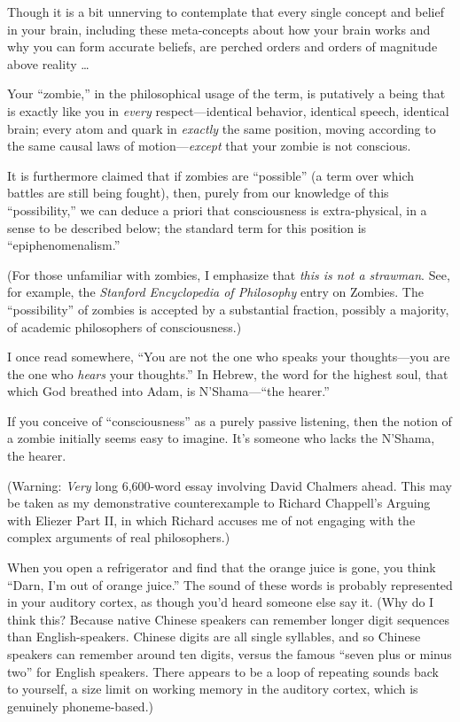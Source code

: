 {
 Though it is a bit unnerving to contemplate that every single
concept and belief in your brain, including these meta-concepts about
how your brain works and why you can form accurate beliefs, are perched
orders and orders of magnitude above reality \ldots}

\myendsectiontext


{
 Your ``zombie,'' in the
philosophical usage of the term, is putatively a being that is exactly
like you in \textit{every} respect---identical behavior, identical
speech, identical brain; every atom and quark in \textit{exactly} the
same position, moving according to the same causal laws of
motion---\textit{except} that your zombie is not conscious.}

{
 It is furthermore claimed that if zombies are
``possible'' (a term over which
battles are still being fought), then, purely from our knowledge of
this ``possibility,'' we can deduce
a priori that consciousness is extra-physical, in a sense to be
described below; the standard term for this position is
``epiphenomenalism.''}

{
 (For those unfamiliar with zombies, I emphasize that \textit{this
is not a strawman}. See, for example, the \textit{Stanford Encyclopedia
of Philosophy} entry on Zombies. The
``possibility'' of zombies is
accepted by a substantial fraction, possibly a majority, of academic
philosophers of consciousness.)}

{
 I once read somewhere, ``You are not the one who
speaks your thoughts---you are the one who \textit{hears} your
thoughts.'' In Hebrew, the word for the highest soul,
that which God breathed into Adam, is
N'Shama---``the
hearer.''}

{
 If you conceive of
``consciousness'' as a purely
passive listening, then the notion of a zombie initially seems easy to
imagine. It's someone who lacks the
N'Shama, the hearer.}

{
 (Warning: \textit{Very} long 6,600-word essay involving David
Chalmers ahead. This may be taken as my demonstrative counterexample to
Richard Chappell's Arguing with Eliezer Part II, in
which Richard accuses me of not engaging with the complex arguments of
real philosophers.)}

{
 When you open a refrigerator and find that the orange juice is
gone, you think ``Darn, I'm out of
orange juice.'' The sound of these words is probably
represented in your auditory cortex, as though you'd
heard someone else say it. (Why do I think this? Because native Chinese
speakers can remember longer digit sequences than English-speakers.
Chinese digits are all single syllables, and so Chinese speakers can
remember around ten digits, versus the famous ``seven
plus or minus two'' for English speakers. There
appears to be a loop of repeating sounds back to yourself, a size limit
on working memory in the auditory cortex, which is genuinely
phoneme-based.)}

